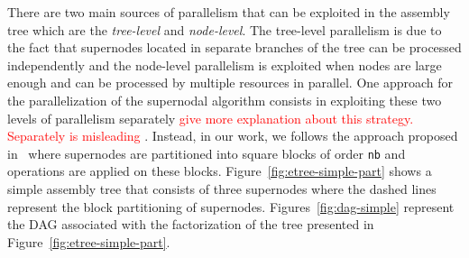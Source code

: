 \documentclass{article}
\newcommand{\alert}[1]{\textcolor{red}{#1}\xspace}
\begin{document}
There are two main sources of parallelism that can be exploited in the
assembly tree which are the \textit{tree-level} and
\textit{node-level}. The tree-level parallelism is due to the fact
that supernodes located in separate branches of the tree can be
processed independently and the node-level parallelism is exploited
when nodes are large enough and can be processed by multiple resources
in parallel. One approach for the parallelization of the supernodal
algorithm consists in exploiting these two levels of parallelism
separately \alert{give more explanation about this
  strategy. Separately is misleading} . Instead, in our work, we
follows the approach proposed in~\cite{h.r.s:10} where supernodes are
partitioned into square blocks of order \texttt{nb} and operations are
applied on these blocks. Figure~\ref{fig:etree-simple-part} shows a
simple assembly tree that consists of three supernodes where the
dashed lines represent the block partitioning of
supernodes. Figures~\ref{fig:dag-simple} represent the DAG associated
with the factorization of the tree presented in
Figure~\ref{fig:etree-simple-part}.
\end{document}
